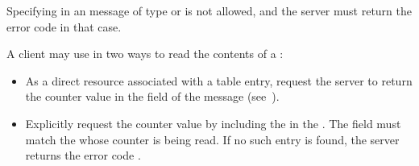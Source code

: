 \documentclass[11pt]{article}
\begin{document}
{%
\noindent{}Specifying  in an  message of type  or
 is not allowed, and the server must return the error code
 in that case.%

A client may use  in two ways to read the contents of a
:%

\begin{itemize}%

\item{}
As a direct resource associated with a table entry, request the server to
return the counter value in the  field of the  message
(see~).%

\item{}
Explicitly request the counter value by including the  in
the . The  field must match the 
whose counter is being read. If no such entry is found, the server returns the
error code .%
\end{itemize}%

}
\end{document}
